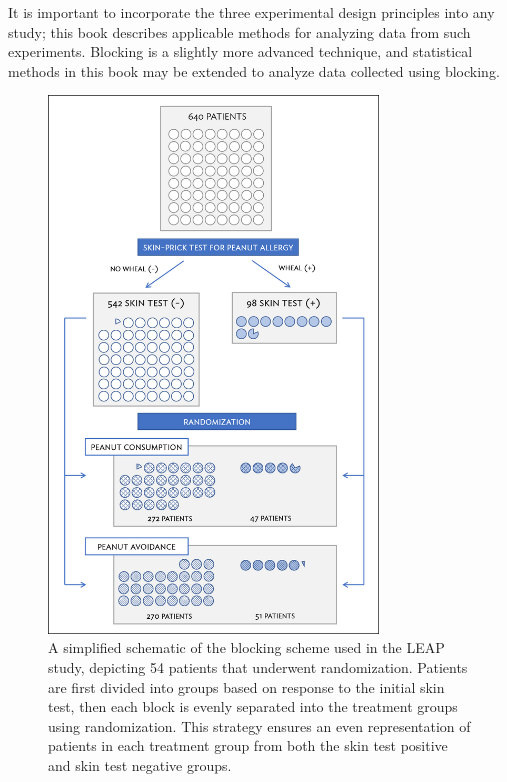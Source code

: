 It is important to incorporate the three experimental design principles into any study; this book describes applicable methods for analyzing data from such experiments. Blocking is a slightly more advanced technique, and statistical methods in this book may be extended to analyze data collected using blocking.

	\begin{figure}
		\centering
		\includegraphics[width=0.78\textwidth]{ch_intro_to_data_oi_biostat/figures/leapBlocking/leapBlocking.png}
		\caption{A simplified schematic of the blocking scheme used in the LEAP study, depicting 54 patients that underwent randomization. Patients are first divided into groups based on response to the initial skin test, then each block is evenly separated into the treatment groups using randomization. This strategy ensures an even representation of patients in each treatment group from both the skin test positive and skin test negative groups.}
		\label{leapBlocking}
	\end{figure}

